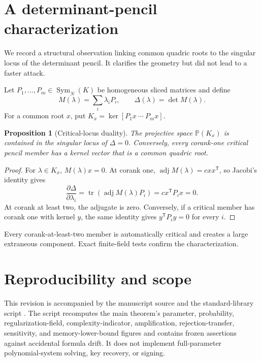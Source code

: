 \documentclass[10pt,a4paper]{article}
\newtheorem{proposition}[theorem]{Proposition}
\newcommand{\PP}{\mathbb P}
\newcommand{\Sym}{\operatorname{Sym}}
\newcommand{\trans}{\mathsf T}
\begin{document}
\section{A determinant-pencil characterization}\label{app:pencil}

We record a structural observation linking common quadric roots to the singular locus of the determinant pencil.  It clarifies the geometry but did not lead to a faster attack.

Let $P_1,\ldots,P_m\in\Sym_N(K)$ be homogeneous sliced matrices and define
\[
M(\lambda)=\sum_i\lambda_iP_i,
\qquad
\Delta(\lambda)=\det M(\lambda).
\]
For a common root $x$, put $K_x=\ker[P_1x\ \cdots\ P_mx]$.

\begin{proposition}[Critical-locus duality]\label{prop:pencil}
The projective space $\PP(K_x)$ is contained in the singular locus of $\Delta=0$.  Conversely, every corank-one critical pencil member has a kernel vector that is a common quadric root.
\end{proposition}

\begin{proof}
For $\lambda\in K_x$, $M(\lambda)x=0$.  At corank one, $\operatorname{adj}M(\lambda)=cxx^{\trans}$, so Jacobi's identity gives
\[
\frac{\partial\Delta}{\partial\lambda_i}
=\operatorname{tr}(\operatorname{adj}M(\lambda)P_i)
=cx^{\trans}P_ix=0.
\]
At corank at least two, the adjugate is zero.  Conversely, if a critical member has corank one with kernel $y$, the same identity gives $y^{\trans}P_iy=0$ for every $i$.
\end{proof}

Every corank-at-least-two member is automatically critical and creates a large extraneous component.  Exact finite-field tests confirm the characterization.

\section{Reproducibility and scope}\label{app:reproducibility}

This revision is accompanied by the manuscript source and the standard-library script .  The script recomputes the main theorem's parameter, probability, regularization-field, complexity-indicator, amplification, rejection-transfer, sensitivity, and memory-lower-bound figures and contains frozen assertions against accidental formula drift.  It does not implement full-parameter polynomial-system solving, key recovery, or signing.
\end{document}
